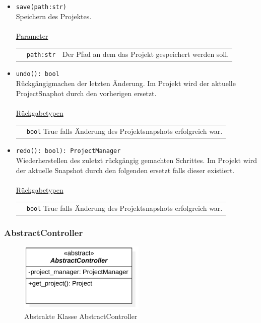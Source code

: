 \documentclass{article}
\begin{document}
\begin{itemize}
\item \texttt{save(path:str)}\\ Speichern des Projektes.\\\\
\underline{{Parameter}}\\
\begin{tabular}{lll}
 & \texttt{path:str} & Der Pfad an dem das Projekt gespeichert werden soll. \\
\end{tabular}
\item \texttt{undo(): bool}\\ Rückgängigmachen der letzten Änderung. Im Projekt wird der aktuelle ProjectSnaphot durch den vorherigen ersetzt.\\\\
\underline{{Rückgabetypen}}\\
\begin{tabular}{lp{10.7cm}}
 & \texttt{bool}  True falls Änderung des Projektsnapshots erfolgreich war.\\
\end{tabular}
\item \texttt{redo(): bool): ProjectManager}\\ Wiederherstellen des zuletzt rückgängig gemachten Schrittes. Im Projekt wird der aktuelle Snapshot durch den folgenden ersetzt falls dieser existiert.\\\\
\underline{{Rückgabetypen}}\\
\begin{tabular}{lp{10.7cm}}
 & \texttt{bool}  True falls Änderung des Projektsnapshots erfolgreich war.\\
\end{tabular}
\end{itemize}


\newpage
\subsubsection*{\large{\textbf{AbstractController}\label{cls:AbstractController}}}\normalsize
\begin{figure}[H]%
    \centering
    \includegraphics[width=6cm]{entwurf/Floriane/AbstractController.png}
    \caption{Abstrakte Klasse AbstractController}
\end{figure}
\end{document}
